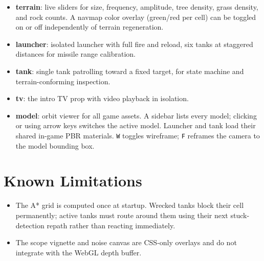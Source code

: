 \documentclass[11pt, a4paper]{article}
\begin{document}
	\begin{itemize}[itemsep=3pt]
		\item \textbf{terrain}: live sliders for size, frequency, amplitude, tree density,
		      grass density, and rock counts. A navmap color overlay (green/red per cell)
		      can be toggled on or off independently of terrain regeneration.
		\item \textbf{launcher}: isolated launcher with full fire and reload, six tanks
		      at staggered distances for missile range calibration.
		\item \textbf{tank}: single tank patrolling toward a fixed target, for state
		      machine and terrain-conforming inspection.
		\item \textbf{tv}: the intro TV prop with video playback in isolation.
		\item \textbf{model}: orbit viewer for all game assets. A sidebar lists every
		      model; clicking or using arrow keys switches the active model. Launcher and
		      tank load their shared in-game PBR materials. \texttt{W} toggles wireframe;
		      \texttt{F} reframes the camera to the model bounding box.
	\end{itemize}

	\section{Known Limitations}

	\begin{itemize}[itemsep=3pt]
		\item The A* grid is computed once at startup. Wrecked tanks block their cell
		      permanently; active tanks must route around them using their next stuck-detection
		      repath rather than reacting immediately.
		\item The scope vignette and noise canvas are CSS-only overlays and do not
		      integrate with the WebGL depth buffer.
	\end{itemize}
\end{document}
